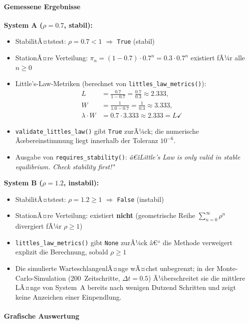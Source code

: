 ﻿\documentclass[a4paper,12pt]{report}
\theoremstyle{definition}
\begin{document}
\paragraph{Gemessene Ergebnisse}

\textbf{System A ($\rho = 0.7$, stabil):}
\begin{itemize}
	\item StabilitÃ¤tstest: $\rho = 0.7 < 1$ \quad$\Rightarrow$\quad
	\texttt{True} (stabil)
	\item StationÃ¤re Verteilung: $\pi_n = (1-0.7)\cdot 0.7^n =
	0.3 \cdot 0.7^n$ existiert fÃ¼r alle $n \geq 0$
	\item Little's-Law-Metriken (berechnet von
	\texttt{littles\_law\_metrics()}):
	\begin{align*}
		L &= \frac{0.7}{1-0.7} = \frac{0.7}{0.3} \approx 2.333, \\
		W &= \frac{1}{1.0 - 0.7} = \frac{1}{0.3} \approx 3.333, \\
		\lambda \cdot W &= 0.7 \cdot 3.333 \approx 2.333 = L \checkmark
	\end{align*}
	\item \texttt{validate\_littles\_law()} gibt \texttt{True} zurÃ¼ck;
	die numerische Ãœbereinstimmung liegt innerhalb der Toleranz
	$10^{-6}$.
	\item Ausgabe von \texttt{requires\_stability()}: \emph{â€žLittle's
		Law is only valid in stable equilibrium.  Check stability
		first!"}
\end{itemize}

\textbf{System B ($\rho = 1.2$, instabil):}
\begin{itemize}
	\item StabilitÃ¤tstest: $\rho = 1.2 \geq 1$ \quad$\Rightarrow$\quad
	\texttt{False} (instabil)
	\item StationÃ¤re Verteilung: existiert \textbf{nicht} (geometrische
	Reihe $\sum_{n=0}^\infty \rho^n$ divergiert fÃ¼r $\rho \geq 1$)
	\item \texttt{littles\_law\_metrics()} gibt \texttt{None} zurÃ¼ck â€“
	die Methode verweigert explizit die Berechnung, sobald
	$\rho \geq 1$
	\item Die simulierte WarteschlangenlÃ¤nge wÃ¤chst unbegrenzt; in
	der Monte-Carlo-Simulation (200~Zeitschritte, $\Delta t = 0.5$)
	Ã¼berschreitet sie die mittlere LÃ¤nge von System~A bereits
	nach wenigen Dutzend Schritten und zeigt keine Anzeichen
	einer Einpendlung.
\end{itemize}

\paragraph{Grafische Auswertung}
\end{document}
